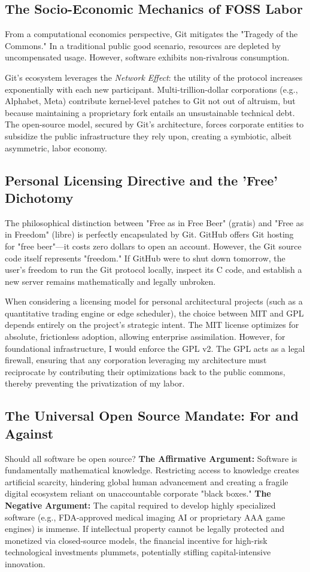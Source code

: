 \subsection{The Socio-Economic Mechanics of FOSS Labor}
From a computational economics perspective, Git mitigates the "Tragedy of the Commons." In a traditional public good scenario, resources are depleted by uncompensated usage. However, software exhibits non-rivalrous consumption. 

Git's ecosystem leverages the \textit{Network Effect}: the utility of the protocol increases exponentially with each new participant. Multi-trillion-dollar corporations (e.g., Alphabet, Meta) contribute kernel-level patches to Git not out of altruism, but because maintaining a proprietary fork entails an unsustainable technical debt. The open-source model, secured by Git's architecture, forces corporate entities to subsidize the public infrastructure they rely upon, creating a symbiotic, albeit asymmetric, labor economy.

\subsection{Personal Licensing Directive and the 'Free' Dichotomy}
The philosophical distinction between "Free as in Free Beer" (gratis) and "Free as in Freedom" (libre) is perfectly encapsulated by Git. GitHub offers Git hosting for "free beer"—it costs zero dollars to open an account. However, the Git source code itself represents "freedom." If GitHub were to shut down tomorrow, the user's freedom to run the Git protocol locally, inspect its C code, and establish a new server remains mathematically and legally unbroken.

When considering a licensing model for personal architectural projects (such as a quantitative trading engine or edge scheduler), the choice between MIT and GPL depends entirely on the project's strategic intent. The MIT license optimizes for absolute, frictionless adoption, allowing enterprise assimilation. However, for foundational infrastructure, I would enforce the GPL v2. The GPL acts as a legal firewall, ensuring that any corporation leveraging my architecture must reciprocate by contributing their optimizations back to the public commons, thereby preventing the privatization of my labor.

\subsection{The Universal Open Source Mandate: For and Against}
Should all software be open source? 
\textbf{The Affirmative Argument:} Software is fundamentally mathematical knowledge. Restricting access to knowledge creates artificial scarcity, hindering global human advancement and creating a fragile digital ecosystem reliant on unaccountable corporate "black boxes."
\textbf{The Negative Argument:} The capital required to develop highly specialized software (e.g., FDA-approved medical imaging AI or proprietary AAA game engines) is immense. If intellectual property cannot be legally protected and monetized via closed-source models, the financial incentive for high-risk technological investments plummets, potentially stifling capital-intensive innovation.